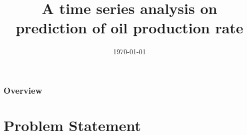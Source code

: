 \documentclass[xcolor=table]{beamer}
\title[A Time Series Prediction on Oil Production]{A time series analysis on prediction of oil production rate} %
\institute[(Halliburton)] %
{Authors: Maryam Bagheri, Li Huang, Manyang Sun, Haoran Zhao
 \\ %
\bigskip
University of Houston
\\
\bigskip
Supervisers:\\ Srinath Madasu, Peggy Linder, Giulia Toti%
}
\author{} %
\date{\today} %
\begin{document}
\begin{frame}
\titlepage %
\end{frame}




\begin{frame}
\frametitle{Overview} %
\tableofcontents %
\end{frame}



\section{Problem Statement} %
\end{document}
